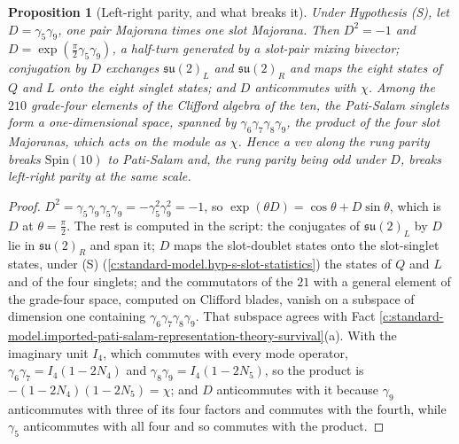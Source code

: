 \documentclass[11pt]{article}
\newtheorem{proposition}[theorem]{Proposition}
\theoremstyle{definition}
\theoremstyle{plain}
\newcommand{\changedmark}[2]{\marginpar{\raggedright\scriptsize\color{#1}#2}}
\providecommand{\su}{}\renewcommand{\su}{\mathfrak{su}}
\begin{document}
\begin{proposition}[Left-right parity, and what breaks it]\label{c:standard-model.left-right-parity-what-breaks-it}
\changedmark{gray}{reworded}
Under Hypothesis (S), let $D = \gamma_{5}\gamma_{9}$, one pair Majorana times one slot Majorana. Then $D^{2} = -1$ and $D = \exp(\tfrac{\pi}{2}\gamma_{5}\gamma_{9})$, a half-turn generated by a slot-pair mixing bivector; conjugation by $D$ exchanges $\su(2)_{L}$ and $\su(2)_{R}$ and maps the eight states of $Q$ and $L$ onto the eight singlet states; and $D$ anticommutes with $\chi$. Among the $210$ grade-four elements of the Clifford algebra of the ten, the Pati-Salam singlets form a one-dimensional space, spanned by $\gamma_{6}\gamma_{7}\gamma_{8}\gamma_{9}$, the product of the four slot Majoranas, which acts on the module as $\chi$. Hence a vev along the rung parity breaks $\mathrm{Spin}(10)$ to Pati-Salam and, the rung parity being odd under $D$, breaks left-right parity at the same scale.
\end{proposition}
\begin{proof}
$D^{2} = \gamma_{5}\gamma_{9}\gamma_{5}\gamma_{9} = -\gamma_{5}^{2}\gamma_{9}^{2} = -1$, so $\exp(\theta D) = \cos\theta + D\sin\theta$, which is $D$ at $\theta = \tfrac{\pi}{2}$. The rest is computed in the script: the conjugates of $\su(2)_{L}$ by $D$ lie in $\su(2)_{R}$ and span it; $D$ maps the slot-doublet states onto the slot-singlet states, under (S) (\ref{c:standard-model.hyp-s-slot-statistics}) the states of $Q$ and $L$ and of the four singlets; and the commutators of the $21$ with a general element of the grade-four space, computed on Clifford blades, vanish on a subspace of dimension one containing $\gamma_{6}\gamma_{7}\gamma_{8}\gamma_{9}$. That subspace agrees with Fact \ref{c:standard-model.imported-pati-salam-representation-theory-survival}(a). With the imaginary unit $I_{4}$, which commutes with every mode operator, $\gamma_{6}\gamma_{7} = I_{4}(1 - 2N_{4})$ and $\gamma_{8}\gamma_{9} = I_{4}(1 - 2N_{5})$, so the product is $-(1 - 2N_{4})(1 - 2N_{5}) = \chi$; and $D$ anticommutes with it because $\gamma_{9}$ anticommutes with three of its four factors and commutes with the fourth, while $\gamma_{5}$ anticommutes with all four and so commutes with the product.

\end{proof}
\end{document}
